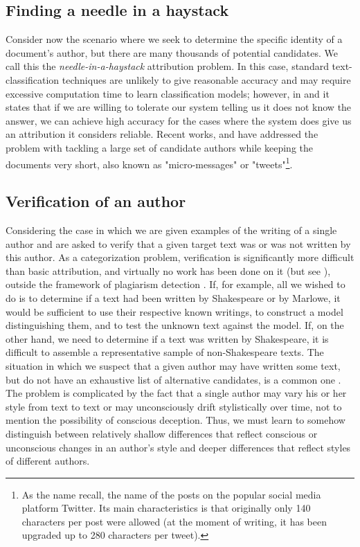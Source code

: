 \subsection{Finding a needle in a haystack}

Consider now the scenario where we seek to determine the specific identity of a document’s author, but there are many thousands of potential candidates. We call this the \textit{needle-in-a-haystack} attribution problem. In this case, standard text-classification techniques are unlikely to give reasonable accuracy and may require excessive computation time to learn classification models; however, in \cite{koppel2009computational} and \cite{koppel2011authorship} it states that if we are willing to tolerate our system telling us it does not know the answer, we can achieve high accuracy for the cases where the system does give us an attribution it considers reliable.
Recent works, \cite{schwartz2013authorship} and \cite{theophilo2019needle} have addressed the problem with tackling a large set of candidate authors while keeping the documents very short, also known as "micro-messages" or "tweets"\footnote{As the name recall, the name of the posts on the popular social media platform Twitter. Its main characteristics is that originally only 140 characters per post were allowed (at the moment of writing, it has been upgraded up to 280 characters per tweet).}.

\subsection{Verification of an author}
 
Considering the case in which we are given examples of the writing of a single author and are asked to verify that a given target text was or was not written by this author. As a categorization problem, verification is significantly more difficult than basic attribution, and virtually no work has been done on it (but see \citeauthor{halteren2004linguistic} \citeyear{halteren2004linguistic}), outside the framework of plagiarism detection \citeauthor{zu2007plagiarism} \citeyear{zu2007plagiarism}. If, for example, all we wished to do is to determine if a text had been written by Shakespeare or by Marlowe, it would be sufficient to use their respective known writings, to construct a model distinguishing them, and to test the unknown text against the model. If, on the other hand, we need
to determine if a text was written by Shakespeare, it is difficult to assemble a representative sample of non-Shakespeare texts.
The situation in which we suspect that a given author may have written some text, but do not have an exhaustive list of alternative candidates, is a common one \cite{koppel2009computational}. The problem is complicated by the fact that a single author may vary his or her style from text to text or may unconsciously drift stylistically over time, not to mention the possibility of conscious deception. Thus, we must learn to somehow distinguish between relatively shallow differences that reflect conscious or unconscious changes in an author’s style and deeper differences that reflect styles of different authors.
